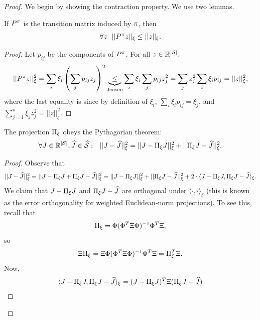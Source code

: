 \begin{proof}
We begin by showing the contraction property. We use two lemmas.
\begin{lemma}\label{lem:P_non_expansion} If $P^\pi$ is the transition matrix induced by $\pi$, then
$$\forall z \ \ ||P^\pi z||_\xi \le ||z||_\xi.$$
\end{lemma}
\begin{proof}
Let $p_{ij}$ be the components of $P^\pi$. For all $z \in \mathbb{R}^{|\mathcal{S}|}$:
$$||P^\pi z||_\xi^2 = \sum_i \xi_i\left(\sum_j p_{ij}z_j\right)^2 \underbrace{\leq}_{\textrm{Jensen}} \sum_i \xi_i \sum_j p_{ij} z_j^2 =  \sum_j z_j^2 \sum_i\xi_i p_{ij} = ||z||_\xi^2,$$
where the last equality is since by definition of $\xi_i$, $\sum_i\xi_i p_{ij}  =\xi_j$, and
$\sum_{j=1}^n\xi_j z_j^2 = ||z||_\xi^2.$
\end{proof}
\begin{lemma}\label{lem:pythagorian}
The projection $\Pi_\xi$ obeys the Pythagorian theorem:
$$\forall J\in \mathbb{R}^{|\States|}, \widehat{J}\in \ftrspace: \ \ ||J-\widehat{J}||_\xi^2 = ||J-\Project_\xi J||_\xi^2 + ||\Project_\xi J - \widehat{J}||_\xi^2.$$
\end{lemma}
\begin{proof}
Observe that
$$||J-\widehat{J}||_\xi^2 = ||J-\Pi_\xi J + \Pi_\xi J - \widehat{J}||_\xi^2 = ||J-\Pi_\xi J||_\xi^2 + ||\Pi_\xi J - \widehat{J}||_\xi^2 + 2 \cdot \langle J-\Pi_\xi J, \Pi_\xi J - \widehat{J}\rangle_\xi.$$
We claim that $J-\Pi_\xi J$ and $\Pi_\xi J-\widehat{J}$ are orthogonal under $\langle\cdot,\cdot\rangle_\xi$ (this is known as the error orthogonality for weighted Euclidean-norm projections). To see this, recall that 
$$
\Pi_\xi = \Phi (\Phi^T \Xi \Phi)^{-1} \Phi^T \Xi,
$$
so
$$
\Xi \Pi_\xi = \Xi \Phi (\Phi^T \Xi \Phi)^{-1} \Phi^T \Xi = \Pi_\xi^T \Xi.
$$
Now, 
\begin{equation*}
    \begin{split}
        \langle J-\Project_\xi J, \Project_\xi J - \widehat{J}\rangle_\xi &= (J-\Project_\xi J)^T \Xi (\Project_\xi J - \widehat{J}) \\

\end{split}
\end{equation*}
\end{proof}
\end{proof}

